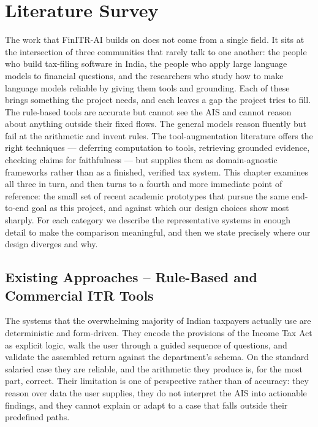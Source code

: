 
\chapter{Literature Survey}
\label{chap:literature}

The work that FinITR-AI builds on does not come from a single field. It sits at
the intersection of three communities that rarely talk to one another: the
people who build tax-filing software in India, the people who apply large
language models to financial questions, and the researchers who study how to
make language models reliable by giving them tools and grounding. Each of these
brings something the project needs, and each leaves a gap the project tries to
fill. The rule-based tools are accurate but cannot see the AIS and cannot reason
about anything outside their fixed flows. The general models reason fluently but
fail at the arithmetic and invent rules. The tool-augmentation literature offers
the right techniques --- deferring computation to tools, retrieving grounded
evidence, checking claims for faithfulness --- but supplies them as
domain-agnostic frameworks rather than as a finished, verified tax system. This
chapter examines all three in turn, and then turns to a fourth and more immediate
point of reference: the small set of recent academic prototypes that pursue the
same end-to-end goal as this project, and against which our design choices show
most sharply. For each category we describe the representative systems in enough
detail to make the comparison meaningful, and then we state precisely where our
design diverges and why.

\section{Existing Approaches -- Rule-Based and Commercial ITR Tools}
\label{sec:category-a}

The systems that the overwhelming majority of Indian taxpayers actually use are
deterministic and form-driven. They encode the provisions of the Income Tax Act
as explicit logic, walk the user through a guided sequence of questions, and
validate the assembled return against the department's schema. On the standard
salaried case they are reliable, and the arithmetic they produce is, for the
most part, correct. Their limitation is one of perspective rather than of
accuracy: they reason over data the user supplies, they do not interpret the AIS
into actionable findings, and they cannot explain or adapt to a case that falls
outside their predefined paths.

